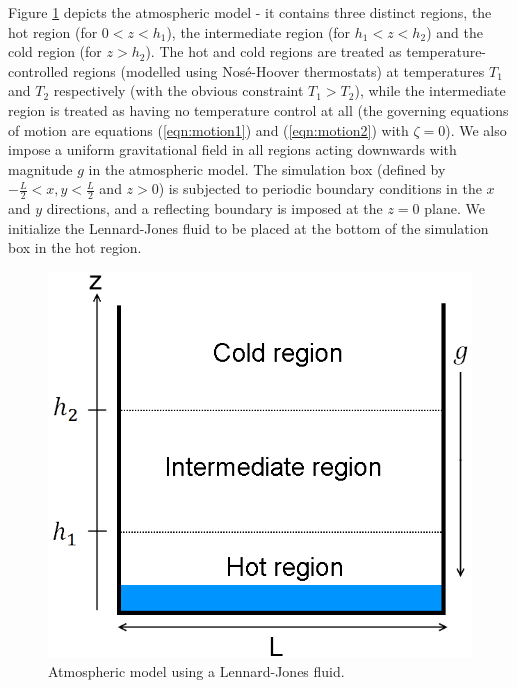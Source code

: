 \documentclass[a4paper,10pt]{article}
\begin{document}
Figure \ref{fig:atmod} depicts the atmospheric model - it contains three distinct regions, the hot region (for $0<z<h_1$), the intermediate region (for $h_1<z<h_2$) and the cold region (for $z>h_2$). The hot and cold regions are treated as temperature-controlled regions (modelled using Nos\'{e}-Hoover thermostats) at temperatures $T_1$ and $T_2$ respectively (with the obvious constraint $T_1 > T_2$), while the intermediate region is treated as having no temperature control at all (the governing equations of motion are equations (\ref{eqn:motion1}) and (\ref{eqn:motion2}) with $\zeta=0$). We also impose a uniform gravitational field in all regions acting downwards with magnitude $g$ in the atmospheric model. The simulation box (defined by $-\frac{L}{2}<x,y<\frac{L}{2}$ and $z>0$) is subjected to periodic boundary conditions in the $x$ and $y$ directions, and a reflecting boundary is imposed at the $z=0$ plane. We initialize the Lennard-Jones fluid to be placed at the bottom of the simulation box in the hot region.

\begin{figure}[htp]
\centering
\includegraphics[scale=0.30]{atmod.png}
\caption{Atmospheric model using a Lennard-Jones fluid.}
\label{fig:atmod}
\end{figure}
\end{document}
